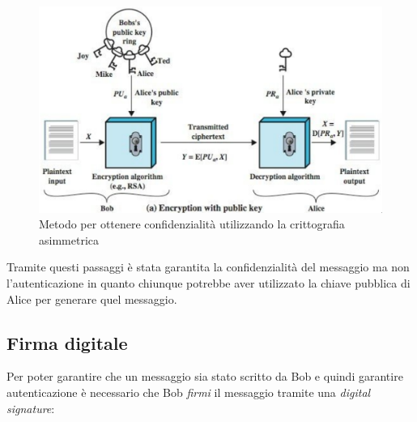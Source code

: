 \begin{figure}[H]
    \centering
    \includegraphics[scale=1.3]{images/confidentiality.png}
    \caption{Metodo per ottenere confidenzialità utilizzando la crittografia asimmetrica}
\end{figure}
Tramite questi passaggi è stata garantita la confidenzialità del messaggio ma non l'autenticazione in quanto chiunque potrebbe aver utilizzato la chiave pubblica di Alice per generare quel messaggio.\newline\newline

\subsection{Firma digitale}
Per poter garantire che un messaggio sia stato scritto da Bob e quindi garantire autenticazione è necessario che Bob \textit{firmi} il messaggio tramite una \textit{digital signature}:


